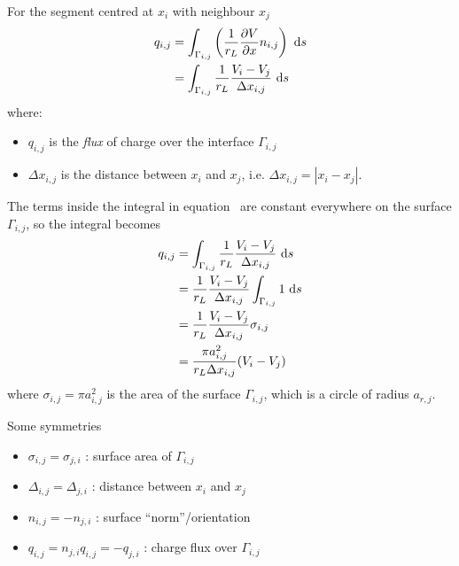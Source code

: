 For the segment centred at $x_i$ with neighbour $x_j$
\begin{align}
    q_{i,j} &= \int_{\Gamma_{i,j}}  \left( \frac{1}{r_L}\frac{\partial{V}}{\partial{x}} n_{i,j} \right) ~\text{d}{s} \nonumber \\
            &= \int_{\Gamma_{i,j}}  \frac{1}{r_L}\frac{V_i-V_j}{\Delta x_{i,j}} ~\text{d}{s}
          \label{eq:q_ij_intermediate}
\end{align}
where:
\begin{itemize}
    \item $q_{i,j}$ is the \emph{flux} of charge over the interface $\Gamma_{i,j}$
    \item $\Delta x_{i,j}$ is the distance between $x_i$ and $x_j$, i.e. $\Delta x_{i,j}=|x_i-x_j|$.
\end{itemize}

The terms inside the integral in equation~ are constant everywhere on the surface $\Gamma_{i,j}$, so the integral becomes
\begin{align}
  q_{i,j} &= \int_{\Gamma_{i,j}}  \frac{1}{r_L}\frac{V_i-V_j}{\Delta x_{i,j}} ~\text{d}{s} \nonumber \\
          &= \frac{1}{r_L}\frac{V_i-V_j}{\Delta x_{i,j}} \int_{\Gamma_{i,j}} 1 ~\text{d}{s} \nonumber \\
          &= \frac{1}{r_L}\frac{V_i-V_j}{\Delta x_{i,j}} \sigma_{i,j} \nonumber \\
          &= \frac{\pi a_{i,j}^2}{r_L \Delta x_{i,j}} (V_i-V_j)
          \label{eq:q_ij}
\end{align}
where $\sigma_{i,j}=\pi a_{i,j}^2$ is the area of the surface $\Gamma_{i,j}$, which is a circle of radius $a_{r,j}$.

Some symmetries
\begin{itemize}
    \item $\sigma_{i,j}=\sigma_{j,i}$ : surface area of $\Gamma_{i,j}$
    \item $\Delta_{i,j}=\Delta_{j,i}$ : distance between $x_i$ and $x_j$
    \item $n_{i,j}=-n_{j,i}$ : surface ``norm''/orientation
    \item $q_{i,j}=n_{j,i}q_{i,j}=-q_{j,i}$ : charge flux over $\Gamma_{i,j}$
\end{itemize}


